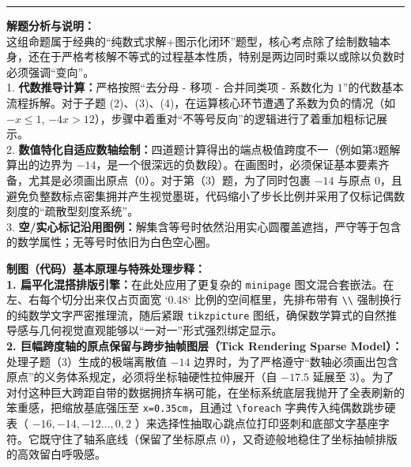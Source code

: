 \documentclass[12pt, a4paper]{ctexrep}
\begin{document}
\vspace{0.6cm}
\hrule
\vspace{0.4cm}

{\small\color{gray}
\textbf{解题分析与说明：}\\
这组命题属于经典的“纯数式求解+图示化闭环”题型，核心考点除了绘制数轴本身，还在于严格考核解不等式的过程基本性质，特别是两边同时乘以或除以负数时必须强调“变向”。\\
1. \textbf{代数推导计算：}严格按照“去分母 - 移项 - 合并同类项 - 系数化为 $1$”的代数基本流程拆解。对于子题 (2)、(3)、(4)，在运算核心环节遭遇了系数为负的情况（如 $-x \leqslant 1$, $-4x > 12$），步骤中着重对“不等号反向”的逻辑进行了着重加粗标记展示。\\
2. \textbf{数值特化自适应数轴绘制：}四道题计算得出的端点极值跨度不一（例如第3题解算出的边界为 $-14$，是一个很深远的负数段）。在画图时，必须保证基本要素齐备，尤其是必须画出原点（$0$）。对于第（3）题，为了同时包裹 $-14$ 与原点 $0$，且避免负整数标点密集拥并产生视觉墨斑，代码缩小了步长比例并采用了仅标记偶数刻度的“疏散型刻度系统”。\\
3. \textbf{空/实心标记沿用图例：}解集含等号时依然沿用实心圆覆盖遮挡，严守等于包含的数学属性；无等号时依旧为白色空心圈。
}

\vspace{0.6cm}

{\small\color{blue!70!black}
\textbf{制图（代码）基本原理与特殊处理步释：}\\
\textbf{1. 扁平化混搭排版引擎：}在此处应用了更复杂的 \texttt{minipage} 图文混合套嵌法。在左、右每个切分出来仅占页面宽 `0.48` 比例的空间框里，先排布带有 \texttt{\textbackslash\textbackslash} 强制换行的纯数学文字严密推理流，随后紧跟 \texttt{tikzpicture} 图纸，确保数学算式的自然推导感与几何视觉直观能够以“一对一”形式强烈绑定显示。\\
\textbf{2. 巨幅跨度轴的原点保留与跨步抽帧图层（Tick Rendering Sparse Model）：}处理子题（3）生成的极端离散值 $-14$ 边界时，为了严格遵守“数轴必须画出包含原点”的义务体系规定，必须将坐标轴硬性拉伸展开（自 $-17.5$ 延展至 $3$）。为了对付这种巨大跨距自带的数据拥挤车祸可能，在坐标系统底层我抛开了全表刷新的笨重感，把缩放基底强压至 \texttt{x=0.35cm}，且通过 \texttt{\textbackslash foreach} 字典传入纯偶数跳步硬表（ $-16,-14,-12\dots,0,2$ ）来选择性抽取心跳点位打印竖刺和底部文字基座字符。它既守住了轴系底线（保留了坐标原点 $0$），又奇迹般地稳住了坐标抽帧排版的高效留白呼吸感。
}

\newpage
\end{document}
